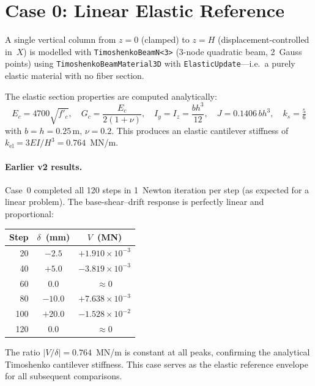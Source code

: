 \section{Case 0: Linear Elastic Reference}
\label{sec:cyclic-case0}

A single vertical column from $z = 0$ (clamped) to $z = H$
(displacement-controlled in~$X$) is modelled with
\texttt{TimoshenkoBeamN<3>} (3-node quadratic beam, 2~Gauss points)
using \texttt{TimoshenkoBeamMaterial3D} with
\texttt{ElasticUpdate}---i.e.\ a purely elastic material with
no fiber section.

The elastic section properties are computed analytically:
\begin{equation}
  E_c = 4700\sqrt{f'_c},\quad
  G_c = \frac{E_c}{2(1+\nu)},\quad
  I_y = I_z = \frac{bh^3}{12},\quad
  J = 0.1406\,bh^3,\quad
  k_s = \tfrac{5}{6}
  \label{eq:case0-props}
\end{equation}
with $b = h = 0.25$\,m, $\nu = 0.2$.  This produces an elastic
cantilever stiffness of $k_{\text{el}} = 3EI/H^3 = 0.764$~MN/m.

\paragraph{Earlier v2 results.}
Case~0 completed all 120 steps in 1~Newton iteration per step
(as expected for a linear problem).  The base-shear--drift
response is perfectly linear and proportional:

\begin{center}
\begin{tabular}{rcc}
\toprule
\textbf{Step} & $\delta$~(mm) & $V$~(MN) \\
\midrule
 20 & $-2.5$  & $+1.910 \times 10^{-3}$ \\
 40 & $+5.0$  & $-3.819 \times 10^{-3}$ \\
 60 & $0.0$   & $\approx 0$ \\
 80 & $-10.0$ & $+7.638 \times 10^{-3}$ \\
100 & $+20.0$ & $-1.528 \times 10^{-2}$ \\
120 & $0.0$   & $\approx 0$ \\
\bottomrule
\end{tabular}
\end{center}

\noindent
The ratio $|V/\delta| = 0.764$~MN/m is constant at all peaks,
confirming the analytical Timoshenko cantilever stiffness.  This
case serves as the elastic reference envelope for all subsequent
comparisons.


